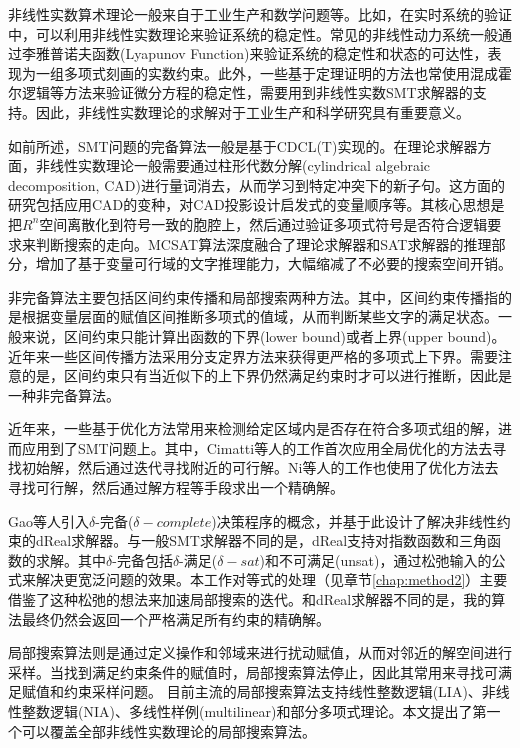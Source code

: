 非线性实数算术理论一般来自于工业生产和数学问题等。比如，在实时系统的验证中，可以利用非线性实数理论来验证系统的稳定性\cite{CPS1,CPS2,CPS3}。常见的非线性动力系统一般通过李雅普诺夫函数(Lyapunov Function)来验证系统的稳定性和状态的可达性，表现为一组多项式刻画的实数约束。此外，一些基于定理证明的方法也常使用混成霍尔逻辑等方法来验证微分方程的稳定性，需要用到非线性实数SMT求解器的支持。因此，非线性实数理论的求解对于工业生产和科学研究具有重要意义。

如前所述，SMT问题的完备算法一般是基于CDCL(T)实现的。在理论求解器方面，非线性实数理论一般需要通过柱形代数分解(cylindrical algebraic decomposition, CAD)\cite{Caviness2004QuantifierEA}进行量词消去，从而学习到特定冲突下的新子句。这方面的研究包括应用CAD的变种\cite{AbrahamDEK21}，对CAD投影设计启发式的变量顺序\cite{LiXZZ23}等。其核心思想是把$R^n$空间离散化到符号一致的胞腔上，然后通过验证多项式符号是否符合逻辑要求来判断搜索的走向。MCSAT算法深度融合了理论求解器和SAT求解器的推理部分，增加了基于变量可行域的文字推理能力，大幅缩减了不必要的搜索空间开销。

非完备算法主要包括区间约束传播和局部搜索两种方法。其中，区间约束传播指的是根据变量层面的赋值区间推断多项式的值域，从而判断某些文字的满足状态。一般来说，区间约束只能计算出函数的下界(lower bound)或者上界(upper bound)。近年来一些区间传播方法采用分支定界方法来获得更严格的多项式上下界。需要注意的是，区间约束只有当近似下的上下界仍然满足约束时才可以进行推断，因此是一种非完备算法。

近年来，一些基于优化方法常用来检测给定区域内是否存在符合多项式组的解，进而应用到了SMT问题上。其中，Cimatti等人的工作\cite{CimattiGLS22}首次应用全局优化的方法去寻找初始解，然后通过迭代寻找附近的可行解。Ni等人的工作也使用了优化方法去寻找可行解\cite{NiWX23}，然后通过解方程\cite{LiXZ23b}等手段求出一个精确解。

Gao等人引入$\delta$-完备($\delta-complete$)决策程序的概念\cite{GaoKC13}，并基于此设计了解决非线性约束的dReal求解器。与一般SMT求解器不同的是，dReal支持对指数函数和三角函数的求解。其中$\delta$-完备包括$\delta$-满足($\delta-sat$)和不可满足(unsat)，通过松弛输入的公式来解决更宽泛问题的效果。本工作对等式的处理（见章节\ref{chap:method2}）主要借鉴了这种松弛的想法来加速局部搜索的迭代。和dReal求解器不同的是，我的算法最终仍然会返回一个严格满足所有约束的精确解。

局部搜索算法则是通过定义操作和邻域来进行扰动赋值，从而对邻近的解空间进行采样。当找到满足约束条件的赋值时，局部搜索算法停止，因此其常用来寻找可满足赋值和约束采样问题。
目前主流的局部搜索算法支持线性整数逻辑(LIA)\cite{CaiLZ22}、非线性整数逻辑(NIA)\cite{CaiLZ2023}、多线性样例(multilinear)\cite{multilinear}和部分多项式理论\cite{LiXZ23}。本文提出了第一个可以覆盖全部非线性实数理论的局部搜索算法。

